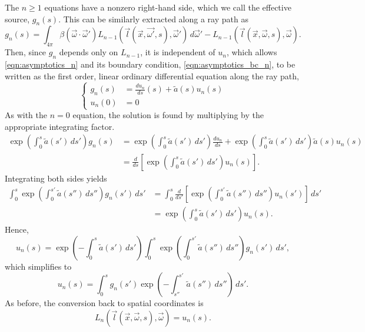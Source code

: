 The $n \geq 1$ equations have a nonzero right-hand side, which we call the effective source, $g_n(s)$.
This can be similarly extracted along a ray path as
\begin{equation*}
  g_n(s) = \int_{4\pi} \beta(\vec{\omega}\cdot\vec{\omega}')
  L_{n-1}(\vec{l}(\vec{x}, \vec{\omega'}, s), \vec{\omega}')\,d\vec{\omega}' - L_{n-1}(\vec{l}(\vec{x}, \vec{\omega}, s), \vec{\omega}).
\end{equation*}
Then, since $g_n$ depends only on $L_{n-1}$, it is independent of $u_n$, which allows \eqref{eqn:asymptotics_n} and its boundary condition, \eqref{eqn:asymptotics_bc_n}, to be written as the first order, linear ordinary differential equation along the ray path,
\begin{equation*}
  \left\{
  \begin{aligned}
    g_n(s) &= \frac{du_n}{ds}(s) + \tilde{a}(s)u_n(s) \\
    u_n(0) &= 0
  \end{aligned}
  \right.
\end{equation*}
As with the $n=0$ equation, the solution is found by multiplying by the appropriate integrating factor.
\begin{align*}
  \exp\left(\int_0^s \tilde{a}(s')\, ds'\right) g_n(s) &= \exp\left(\int_0^s \tilde{a}(s')\, ds'\right) \frac{du_n}{ds} + \exp\left(\int_0^s \tilde{a}(s')\, ds'\right) \tilde{a}(s) u_n(s) \\
  &= \frac{d}{ds}\left[\exp\left(\int_0^s \tilde{a}(s')\, ds'\right) u_n(s)\right].
\end{align*}
Integrating both sides yields
\begin{align*}
  \int_0^s\exp\left(\int_0^{s'} \tilde{a}(s'')\, ds''\right) g_n(s')\, ds' &= \int_0^s \frac{d}{ds'}\left[\exp\left(\int_0^{s'} \tilde{a}(s'')\, ds''\right) u_n(s')\right]\, ds' \\
  &= \exp\left(\int_0^s \tilde{a}(s')\, ds'\right) u_n(s).
\end{align*}
Hence,
\begin{equation*}
  u_n(s) = \exp\left(-\int_0^s \tilde{a}(s')\, ds'\right) \int_0^s\exp\left(\int_0^{s'} \tilde{a}(s'')\, ds''\right) g_n(s')\, ds',
\end{equation*}
which simplifies to
\begin{equation}
  u_n(s) = \int_0^sg_n(s')\exp\left( -\int_{s''}^{s'}\tilde{a}(s'')\,ds'' \right)\, ds'.
  \label{eqn:asymptotics_soln_n}
\end{equation}
As before, the conversion back to spatial coordinates is
\begin{equation*}
  L_n(\vec{l}(\vec{x}, \vec{\omega}, s), \vec{\omega}) = u_n(s).
\end{equation*}
